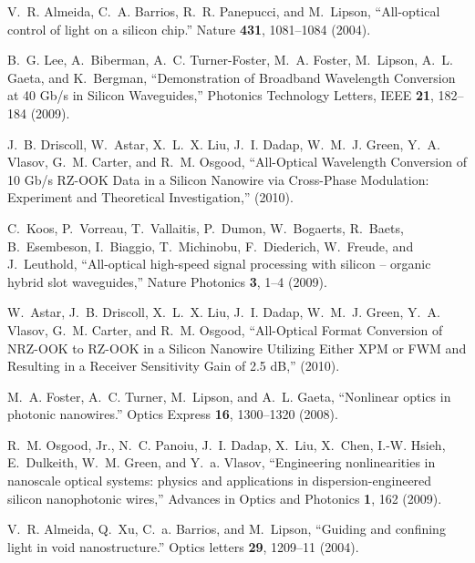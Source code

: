 \documentclass[10pt,letterpaper]{article}
\begin{document}
\begin{thebibliography}{10}
\newcommand{\enquote}[1]{``#1''}

V.~R. Almeida, C.~A. Barrios, R.~R. Panepucci, and M.~Lipson,
  \enquote{{All-optical control of light on a silicon chip.}} Nature
  \textbf{431}, 1081--1084 (2004).

B.~G. Lee, A.~Biberman, A.~C. Turner-Foster, M.~A. Foster, M.~Lipson, A.~L.
  Gaeta, and K.~Bergman, \enquote{{Demonstration of Broadband Wavelength
  Conversion at 40 Gb/s in Silicon Waveguides},} Photonics Technology Letters,
  IEEE \textbf{21}, 182--184 (2009).

J.~B. Driscoll, W.~Astar, X.~L.~X. Liu, J.~I. Dadap, W.~M.~J. Green, Y.~A.
  Vlasov, G.~M. Carter, and R.~M. Osgood, \enquote{{All-Optical Wavelength
  Conversion of 10 Gb/s RZ-OOK Data in a Silicon Nanowire via Cross-Phase
  Modulation: Experiment and Theoretical Investigation},}  (2010).

C.~Koos, P.~Vorreau, T.~Vallaitis, P.~Dumon, W.~Bogaerts, R.~Baets,
  B.~Esembeson, I.~Biaggio, T.~Michinobu, F.~Diederich, W.~Freude, and
  J.~Leuthold, \enquote{{All-optical high-speed signal processing with silicon
  – organic hybrid slot waveguides},} Nature Photonics \textbf{3}, 1--4
  (2009).

W.~Astar, J.~B. Driscoll, X.~L.~X. Liu, J.~I. Dadap, W.~M.~J. Green, Y.~A.
  Vlasov, G.~M. Carter, and R.~M. Osgood, \enquote{{All-Optical Format
  Conversion of NRZ-OOK to RZ-OOK in a Silicon Nanowire Utilizing Either XPM or
  FWM and Resulting in a Receiver Sensitivity Gain of 2.5 dB},}  (2010).

M.~A. Foster, A.~C. Turner, M.~Lipson, and A.~L. Gaeta, \enquote{{Nonlinear
  optics in photonic nanowires.}} Optics Express \textbf{16}, 1300--1320
  (2008).

R.~M. Osgood, Jr., N.~C. Panoiu, J.~I. Dadap, X.~Liu, X.~Chen, I.-W. Hsieh,
  E.~Dulkeith, W.~M. Green, and Y.~a. Vlasov, \enquote{{Engineering
  nonlinearities in nanoscale optical systems: physics and applications in
  dispersion-engineered silicon nanophotonic wires},} Advances in Optics and
  Photonics \textbf{1}, 162 (2009).

V.~R. Almeida, Q.~Xu, C.~a. Barrios, and M.~Lipson, \enquote{{Guiding and
  confining light in void nanostructure.}} Optics letters \textbf{29}, 1209--11
  (2004).


\end{thebibliography}
\end{document}
